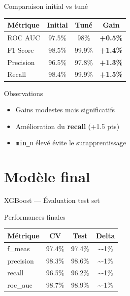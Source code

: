 \documentclass[
  10pt,
  ignorenonframetext,
  aspectratio=169,
]{beamer}
\providecommand{\tightlist}{%
  \setlength{\itemsep}{0pt}\setlength{\parskip}{0pt}}\usepackage{longtable,booktabs,array}
\begin{document}
\begin{frame}[fragile]{Comparaison initial vs tuné}
\label{comparaison-initial-vs-tunuxe9}
\begingroup\fontsize{9}{11}\selectfont

\begin{longtable*}[t]{lcc>{}c}
\toprule
Métrique & Initial & Tuné & Gain\\
\midrule
ROC AUC & 97.5\% & 98\% & \textcolor[HTML]{1D9E75}{\textbf{+0.5\%}}\\
F1-Score & 98.5\% & 99.9\% & \textcolor[HTML]{1D9E75}{\textbf{+1.4\%}}\\
Precision & 96.5\% & 97.8\% & \textcolor[HTML]{1D9E75}{\textbf{+1.3\%}}\\
Recall & 98.4\% & 99.9\% & \textcolor[HTML]{1D9E75}{\textbf{+1.5\%}}\\
\bottomrule
\end{longtable*}
\endgroup{}

\begin{block}{Observations}
\label{observations}
\begin{itemize}
\tightlist
\item
  Gains modestes mais significatifs
\item
  Amélioration du \textbf{recall} (+1.5 pts)
\item
  \texttt{min\_n} élevé évite le surapprentissage
\end{itemize}
\end{block}
\end{frame}

\section{Modèle final}\label{moduxe8le-final}

\begin{frame}{XGBoost --- Évaluation test set}
\label{xgboost-uxe9valuation-test-set}
\begin{block}{Performances finales}
\label{performances-finales}
\begingroup\fontsize{9}{11}\selectfont

\begin{longtable*}[t]{lccc}
\toprule
Métrique & CV & Test & Delta\\
\midrule
f\_meas & 97.4\% & 97.4\% & \textasciitilde{}-1\%\\
precision & 98.3\% & 98.6\% & \textasciitilde{}-1\%\\
recall & 96.5\% & 96.2\% & \textasciitilde{}-1\%\\
roc\_auc & 98.7\% & 98.9\% & \textasciitilde{}-1\%\\
\bottomrule
\end{longtable*}
\endgroup{}
\end{block}
\end{frame}
\end{document}
